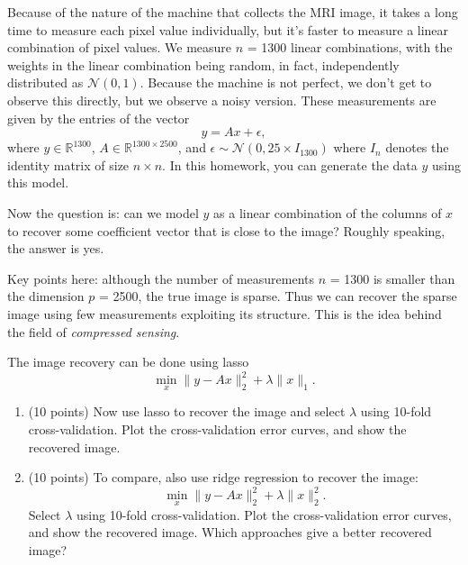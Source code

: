\documentclass[12pt]{article}
\begin{document}
Because of the nature of the machine that collects the MRI image, it takes a long time to measure each pixel value individually, but it's faster to measure a linear combination of pixel values. We measure $n$ = 1300 linear combinations, with the weights in the linear combination being random, in fact, independently distributed as $\mathcal{N}(0,1)$. Because the machine is not perfect, we don't get to observe this directly, but we observe a noisy version. These measurements are given by the entries of the vector
\[
y = A x + \epsilon,
\]
where $y \in \mathbb R^{1300}$, $A \in \mathbb R^{1300\times 2500}$, and $\epsilon \sim \mathcal N(0, 25\times I_{1300})$ where $I_n$ denotes the identity matrix of size $n\times n$. In this homework, you can generate the data $y$ using this model. 

Now the question is: can we model $y$ as a linear combination of the columns of $x$ to recover some coefficient vector that is close to the image? Roughly speaking, the answer is yes. 

Key points here: although the number of measurements $n$ = 1300 is smaller than the dimension $p$ = 2500, the true image is sparse. Thus we can recover the sparse image using few measurements exploiting its structure. This is the idea behind the field of \textit{compressed sensing}. 

The image recovery can be done using lasso
\[
\min_x \|y-Ax\|_2^2 + \lambda \|x\|_1.
\]
\begin{enumerate}
\item (10 points) Now use lasso to recover the image and select $\lambda$ using 10-fold cross-validation. Plot the cross-validation error curves, and show the recovered image. 
\item (10 points) To compare, also use ridge regression to recover the image:
\[
\min_x \|y-Ax\|_2^2 + \lambda \|x\|_2^2.
\]
Select $\lambda$ using 10-fold cross-validation. Plot the cross-validation error curves, and show the recovered image. Which approaches give a better recovered image?
\end{enumerate}
\end{document}
